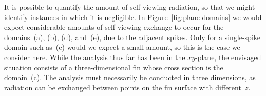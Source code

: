It is possible to quantify the amount of self-viewing radiation,
so that we might identify instances in which it is negligible.
In Figure~\ref{fig:plane-domains} we would expect
considerable amounts of self-viewing exchange
to occur for the domains~(a), (b), (d), and~(e),
due to the adjacent spikes.
Only for a single-spike domain such as~(c)
would we expect a small amount,
so this is the case we consider here.
While the analysis thus far has been in the $xy$-plane,
the envisaged situation consists of a three-dimensional fin
whose cross section is the domain~(c).
The analysis must necessarily be conducted in three dimensions,
as radiation can be exchanged between points on the fin surface
with different~$z$.

\begin{figure}
\end{figure}

